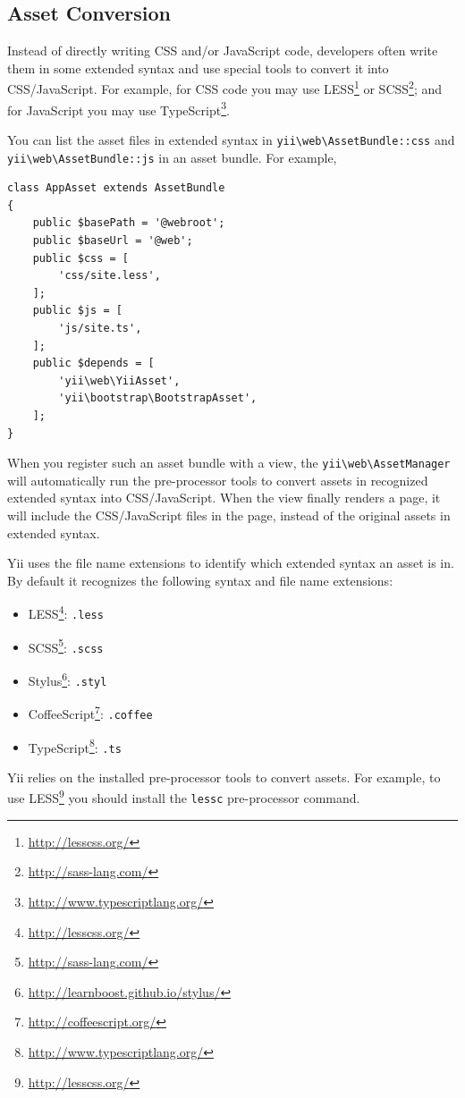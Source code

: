 \subsection{Asset Conversion \label{structure-assets.md::asset-conversion}}
Instead of directly writing CSS and/or JavaScript code, developers often write them in some extended syntax and
use special tools to convert it into CSS/JavaScript. For example, for CSS code you may use LESS\footnote{\url{http://lesscss.org/}}
or SCSS\footnote{\url{http://sass-lang.com/}}; and for JavaScript you may use TypeScript\footnote{\url{http://www.typescriptlang.org/}}.

You can list the asset files in extended syntax in \texttt{yii{\allowbreak{}\textbackslash}web{\allowbreak{}\textbackslash}AssetBundle\allowbreak{}::\allowbreak{}css} and \texttt{yii{\allowbreak{}\textbackslash}web{\allowbreak{}\textbackslash}AssetBundle\allowbreak{}::\allowbreak{}js}
in an asset bundle. For example,

\lstset{language=php}\begin{lstlisting}
class AppAsset extends AssetBundle
{
    public $basePath = '@webroot';
    public $baseUrl = '@web';
    public $css = [
        'css/site.less',
    ];
    public $js = [
        'js/site.ts',
    ];
    public $depends = [
        'yii\web\YiiAsset',
        'yii\bootstrap\BootstrapAsset',
    ];
}
\end{lstlisting}
When you register such an asset bundle with a view, the \texttt{yii{\allowbreak{}\textbackslash}web{\allowbreak{}\textbackslash}AssetManager} will automatically
run the pre-processor tools to convert assets in recognized extended syntax into CSS/JavaScript. When the view
finally renders a page, it will include the CSS/JavaScript files in the page, instead of the original assets
in extended syntax.

Yii uses the file name extensions to identify which extended syntax an asset is in. By default it recognizes
the following syntax and file name extensions:

\begin{itemize}
\item LESS\footnote{\url{http://lesscss.org/}}: \lstinline|.less|
\item SCSS\footnote{\url{http://sass-lang.com/}}: \lstinline|.scss|
\item Stylus\footnote{\url{http://learnboost.github.io/stylus/}}: \lstinline|.styl|
\item CoffeeScript\footnote{\url{http://coffeescript.org/}}: \lstinline|.coffee|
\item TypeScript\footnote{\url{http://www.typescriptlang.org/}}: \lstinline|.ts|
\end{itemize}
Yii relies on the installed pre-processor tools to convert assets. For example, to use LESS\footnote{\url{http://lesscss.org/}}
you should install the \lstinline|lessc| pre-processor command.

